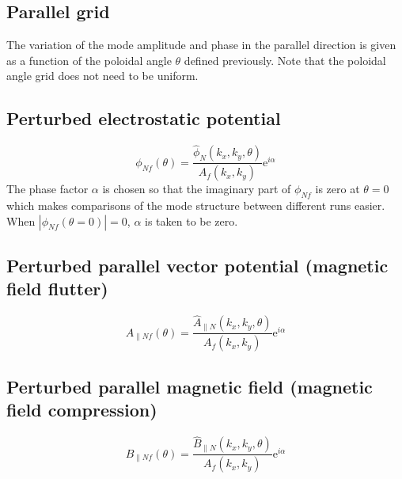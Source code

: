 \documentclass[a4paper]{report}
\begin{document}
\subsection{Parallel grid}
The variation of the mode amplitude and phase in the parallel direction is given as a function of the poloidal angle $\theta$ defined previously. Note that the poloidal angle grid does not need to be uniform.
\subsection{Perturbed electrostatic potential}
$$\phi_{Nf}(\theta) = \frac{\hat{\phi}_N(k_x,k_y,\theta)}{A_f(k_x,k_y)}\textrm{e}^{i\alpha}$$
The phase factor $\alpha$ is chosen so that the imaginary part of $\phi_{Nf}$ is zero at $\theta=0$ which makes comparisons of the mode structure between different runs easier.
When $|\phi_{Nf}(\theta=0)|=0$, $\alpha$ is taken to be zero.
 
\subsection{Perturbed parallel vector potential (magnetic field flutter)}
$$A_{\parallel Nf}(\theta) = \frac{\hat{A}_{\parallel N}(k_x,k_y,\theta)}{A_f(k_x,k_y)}\textrm{e}^{i\alpha}$$
\subsection{Perturbed parallel magnetic field (magnetic field compression)}
$$B_{\parallel Nf}(\theta) = \frac{\hat{B}_{\parallel N}(k_x,k_y,\theta)}{A_f(k_x,k_y)}\textrm{e}^{i\alpha}$$
\end{document}
